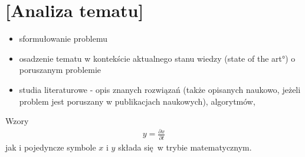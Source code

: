 \chapter{[Analiza tematu]}

\begin{itemize}
\item sformułowanie problemu
\item osadzenie tematu w kontekście aktualnego stanu wiedzy (\ang{state of the art}) o poruszanym problemie
\item  studia literaturowe \cite{bib:artykul,bib:ksiazka,bib:konferencja,bib:internet} -  opis znanych rozwiązań (także opisanych naukowo, jeżeli problem jest poruszany w publikacjach naukowych), algorytmów, 
\end{itemize}


Wzory  
\begin{align}
y = \frac{\partial x}{\partial t}
\end{align}
jak i pojedyncze symbole $x$ i $y$  składa się w trybie matematycznym.

